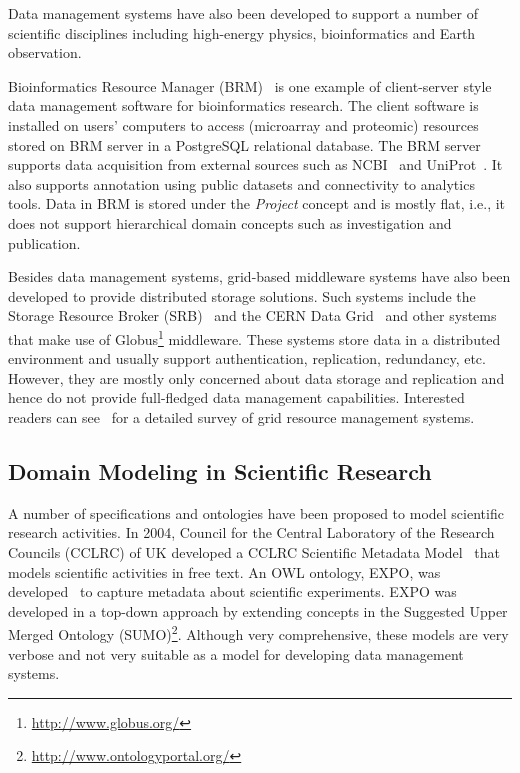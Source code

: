 \documentclass{elsarticle}
\begin{document}
Data management systems have also been developed to support a number
of scientific disciplines including high-energy physics, bioinformatics
and Earth observation.

Bioinformatics Resource Manager (BRM)~\cite{brm2007} is one example of
client-server style data management software for bioinformatics
research. The client software is installed on users' computers to access
(microarray and proteomic) resources stored on BRM server in a
PostgreSQL relational database.
The BRM server supports data acquisition from external sources such as
NCBI~\cite{DBLP:journals/nar/WheelerBBBCCCDEFGHKKKLMMOPSSSSSSSSTTWY06}
and UniProt~\cite{AmosBairoch01012005}. It also supports annotation
using public datasets and connectivity to analytics tools. Data in
BRM is stored under the \emph{Project} concept and is mostly flat, i.e.,
it does not support hierarchical domain concepts such as investigation
and publication.

Besides data management systems, grid-based middleware
systems have also been developed to provide distributed
storage solutions. Such systems include the Storage
Resource Broker (SRB)~\cite{783165} and the CERN Data Grid~\cite{652836}
and other systems that make use of Globus\footnote{\url{http://www.globus.org/}}
middleware. These systems store data in a distributed environment
and usually support authentication, replication, redundancy, etc.
However, they are mostly only concerned about data storage and
replication and hence do not provide full-fledged data management
capabilities. Interested readers can see~\cite{565296}
for a detailed survey of grid resource management systems.

\subsection{Domain Modeling in Scientific Research}
A number of specifications and ontologies have been proposed to
model scientific research activities. In 2004, Council for the
Central Laboratory of the Research Councils (CCLRC) of UK developed
a CCLRC Scientific Metadata Model~\cite{Spallation_metadatamodel}
that models scientific activities in free text. An OWL ontology,
EXPO, was developed~\cite{citeulike:3735746} to capture metadata
about scientific experiments. EXPO was developed in a top-down
approach by extending concepts in the Suggested Upper Merged
Ontology (SUMO)\footnote{\url{http://www.ontologyportal.org/}}.
Although very comprehensive, these models are very verbose and not
very suitable as a model for developing data management systems.
\end{document}
